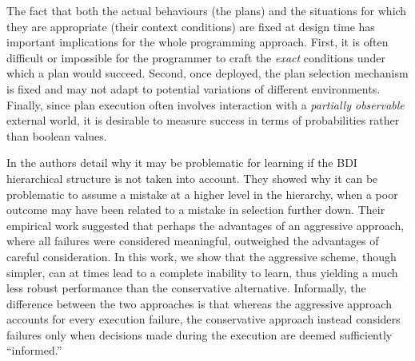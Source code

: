 The fact that both the actual behaviours (the plans) and the situations for which
they are appropriate (their context conditions) are fixed at design time has
important implications for the whole programming approach.
First, it is often difficult or impossible for the programmer to craft the
\emph{exact} conditions under which a plan would succeed. Second, once deployed,
the plan selection mechanism is fixed and may not adapt to potential variations
of different environments.
Finally, since plan execution often involves interaction with a \emph{partially
observable} external world, it is desirable to measure success in terms of
probabilities rather than boolean values.


In \cite{Airiau:IJAT09} the authors detail why it may be problematic for
learning if the BDI hierarchical structure is not taken into account.
They showed why it can be problematic to assume a mistake at a
higher level in the hierarchy, when a poor outcome may have been
related to a mistake in selection further down.  Their
empirical work suggested that perhaps the advantages of an aggressive
approach, where all failures were considered meaningful, outweighed
the advantages of careful consideration.
%
In this work, we show that the aggressive scheme, though simpler, can at times lead to a complete inability to learn, thus yielding a much less robust performance than the conservative alternative.
Informally, the difference between the two approaches is that whereas the
aggressive approach accounts for every execution failure, the conservative
approach instead considers failures only when decisions made during the execution
are deemed sufficiently ``informed.''


